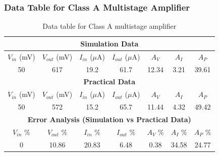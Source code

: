 \documentclass[12pt]{article}
\begin{document}
\subsubsection{Data Table for Class A Multistage Amplifier}
\bgroup
\def\arraystretch{1.5}
\begin{table}[h!]
    \centering
    \caption{Data table for Class A multistage amplifier}
    \begin{tabular}{|c|c|c|c|c|c|c|}
        \hline
        \multicolumn{7}{|c|}{\textbf{Simulation Data}} \\
        \hline
        $V_{in}$ (mV) & $V_{out}$ (mV) & $I_{in}$ ($\mu$A) & $I_{out}$ ($\mu$A) & $A_V$ & $A_I$ & $A_P$ \\ \hline
        50 & 617 & 19.2 & 61.7 & 12.34 & 3.21 & 39.61 \\ \hline\hline
        \multicolumn{7}{|c|}{\textbf{Practical Data}} \\
        \hline
        $V_{in}$ (mV) & $V_{out}$ (mV) & $I_{in}$ ($\mu$A) & $I_{out}$ ($\mu$A) & $A_V$ & $A_I$ & $A_P$ \\ \hline
        50 & 572 & 15.2 & 65.7 & 11.44 & 4.32 & 49.42 \\ \hline\hline
        \multicolumn{7}{|c|}{\textbf{Error Analysis (Simulation vs Practical Data)}} \\
        \hline
        $V_{in}$ \% & $V_{out}$ \% & $I_{in}$ \% & $I_{out}$ \% & $A_V$ \% & $A_I$ \% & $A_P$ \% \\ \hline
        0 & 10.86 & 20.83 & 6.48 & 0.38 & 34.58 & 24.77 \\ \hline
    \end{tabular}
\end{table}
\egroup
\end{document}
